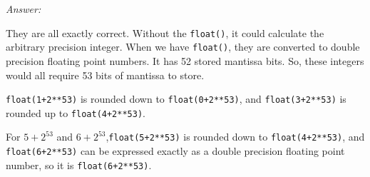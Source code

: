 \documentclass[11pt]{article}
\newcommand{\answer}{{\color{red}\textit{Answer: }}}
\begin{document}
\answer

They are all exactly correct. Without the \verb+float()+, it could calculate 
the arbitrary precision integer. When we have \verb+float()+, they are 
converted to double precision floating point numbers. It has 52 stored 
mantissa bits. So, these integers would all require 53 bits of mantissa to store.

\texttt{float(1+2**53)} is rounded down to \texttt{float(0+2**53)}, and
\texttt{float(3+2**53)} is rounded up to \texttt{float(4+2**53)}.

For $5+2^{53}$ and $6+2^{53}$,\texttt{float(5+2**53)} is rounded down to \texttt{float(4+2**53)}, and \texttt{float(6+2**53)} can be expressed exactly 
as a double precision floating point number, so it is \texttt{float(6+2**53)}.
\end{document}
